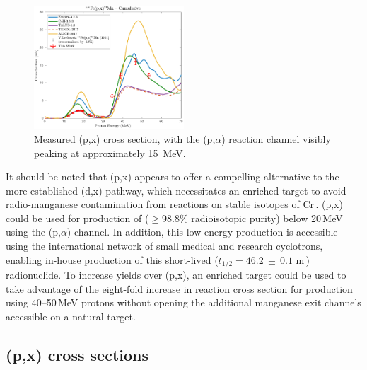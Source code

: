\begin{figure}
 \centering
 \includegraphics[width=0.5\textwidth]{./figures/51Mn.pdf}
 \caption{Measured (p,x) cross section, with the (p,$\alpha$) reaction channel visibly peaking at approximately \mbox{15 MeV}.}
 \label{fig:51Mn}
\end{figure}




It should be noted that  (p,x) appears to offer a compelling alternative to the more established (d,x) pathway, which necessitates an enriched  target to avoid radio-manganese contamination from reactions on stable isotopes of Cr\,\cite{Klein2000}.
(p,x) could be used for 
production of   ($\geq$98.8\% radioisotopic purity) below 20\,MeV using the (p,$\alpha$) channel.
In addition, this low-energy production is accessible using the international network of small medical and research cyclotrons, enabling in-house production of this short-lived ($t_{1/2}=46.2~\pm~0.1$ m\,\cite{Wang2017}) radionuclide.
To increase yields over (p,x), an enriched  target could be used to take advantage of the eight-fold increase in reaction cross section for production using 40--50\,MeV protons without opening the additional manganese exit channels accessible on a natural target.









\subsection{(p,x) cross sections}



